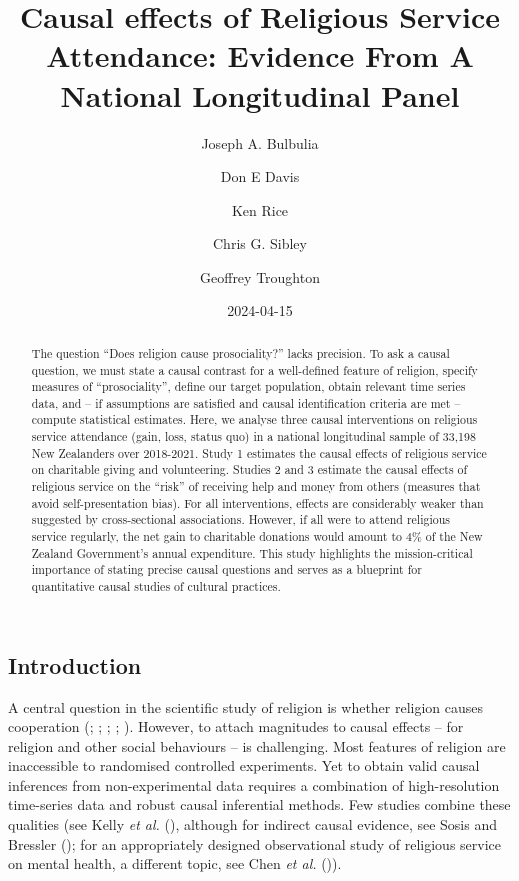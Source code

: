 \documentclass[
  single column]{article}
\title{Causal effects of Religious Service Attendance: Evidence From A
National Longitudinal Panel}
\author{Joseph A. Bulbulia \and Don E Davis \and Ken Rice \and Chris G.
Sibley \and Geoffrey Troughton}
\date{2024-04-15}
\begin{document}
\maketitle
\begin{abstract}
The question ``Does religion cause prosociality?'' lacks precision. To
ask a causal question, we must state a causal contrast for a
well-defined feature of religion, specify measures of ``prosociality'',
define our target population, obtain relevant time series data, and --
if assumptions are satisfied and causal identification criteria are met
-- compute statistical estimates. Here, we analyse three causal
interventions on religious service attendance (gain, loss, status quo)
in a national longitudinal sample of 33,198 New Zealanders over
2018-2021. Study 1 estimates the causal effects of religious service on
charitable giving and volunteering. Studies 2 and 3 estimate the causal
effects of religious service on the ``risk'' of receiving help and money
from others (measures that avoid self-presentation bias). For all
interventions, effects are considerably weaker than suggested by
cross-sectional associations. However, if all were to attend religious
service regularly, the net gain to charitable donations would amount to
4\% of the New Zealand Government's annual expenditure. This study
highlights the mission-critical importance of stating precise causal
questions and serves as a blueprint for quantitative causal studies of
cultural practices.
\end{abstract}

\subsection{Introduction}\label{introduction}

A central question in the scientific study of religion is whether
religion causes cooperation (; ;
;
;
). However, to attach
magnitudes to causal effects -- for religion and other social behaviours
-- is challenging. Most features of religion are inaccessible to
randomised controlled experiments. Yet to obtain valid causal inferences
from non-experimental data requires a combination of high-resolution
time-series data and robust causal inferential methods. Few studies
combine these qualities (see Kelly \emph{et al.}
(), although for indirect
causal evidence, see Sosis and Bressler
(); for an appropriately
designed observational study of religious service on mental health, a
different topic, see Chen \emph{et al.}
()).
\end{document}
